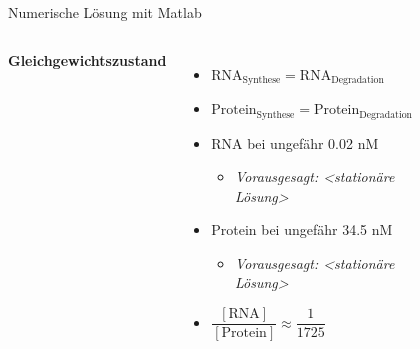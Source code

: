 \documentclass[11pt,aspectratio=169,reqno]{beamer}
\begin{document}
\begin{frame}{Numerische Lösung mit Matlab}
    \begin{columns}
            \textbf{Gleichgewichtszustand}\\[1em]
            
            \begin{itemize}
                \item $\text{RNA}_\text{Synthese}=\text{RNA}_\text{Degradation}$
                \item $\text{Protein}_\text{Synthese}=\text{Protein}_\text{Degradation}$
                \item RNA bei ungefähr 0.02 nM
                \begin{itemize}
                    \item \emph{\tiny Vorausgesagt: <stationäre Lösung>}
                \end{itemize}
                \item Protein bei ungefähr 34.5 nM
                \begin{itemize}
                    \item \emph{\tiny Vorausgesagt: <stationäre Lösung>}
                \end{itemize}

                \item $\dfrac{[\text{RNA}]}{[\text{Protein}]}\approx \dfrac{1}{1725}$
            \end{itemize}
        
        \begin{figure}
            \centering
            \includegraphics[width=\linewidth]{images/negative_autoregulation_basic.m.png}
        \end{figure}
    \end{columns}
\end{frame}
\end{document}
